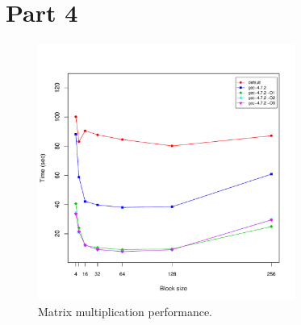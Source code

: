 \documentclass[10pt]{scrartcl}
\begin{document}
\section{Part 4}
\begin{figure}
  \centering
  \includegraphics[width=0.75\textwidth]{part4}
  \caption{Matrix multiplication performance.}\label{fig:part4}
\end{figure}
\end{document}
